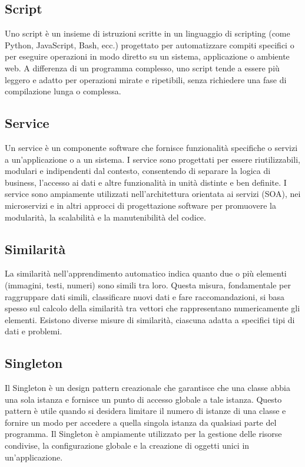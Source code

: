 \subsection*{Script}
Uno script è un insieme di istruzioni scritte in un linguaggio di scripting (come Python, JavaScript, Bash, ecc.) progettato per automatizzare compiti 
specifici o per eseguire operazioni in modo diretto su un sistema, applicazione o ambiente web. A differenza di un programma complesso, uno script tende 
a essere più leggero e adatto per operazioni mirate e ripetibili, senza richiedere una fase di compilazione lunga o complessa.

\hypertarget{sec:service}{}
\subsection*{Service}
Un service è un componente software che fornisce funzionalità specifiche o servizi a un'applicazione o a un sistema. I service sono progettati per
essere riutilizzabili, modulari e indipendenti dal contesto, consentendo di separare la logica di business, l'accesso ai dati e altre funzionalità
in unità distinte e ben definite. I service sono ampiamente utilizzati nell'architettura orientata ai servizi (SOA), nei microservizi e in altri
approcci di progettazione software per promuovere la modularità, la scalabilità e la manutenibilità del codice.

\hypertarget{sec:similarità}{}
\subsection*{Similarità}
La similarità nell'apprendimento automatico indica quanto due o più elementi (immagini, testi, numeri) sono simili tra loro. 
Questa misura, fondamentale per raggruppare dati simili, classificare nuovi dati e fare raccomandazioni, si basa spesso sul calcolo 
della similarità tra vettori che rappresentano numericamente gli elementi. Esistono diverse misure di similarità, ciascuna adatta a 
specifici tipi di dati e problemi.

\hypertarget{sec:singleton}{}
\subsection*{Singleton}
Il Singleton è un design pattern creazionale che garantisce che una classe abbia una sola istanza e fornisce un punto di accesso globale a tale istanza.
Questo pattern è utile quando si desidera limitare il numero di istanze di una classe e fornire un modo per accedere a quella singola istanza da qualsiasi
parte del programma. Il Singleton è ampiamente utilizzato per la gestione delle risorse condivise, la configurazione globale e la creazione di oggetti
unici in un'applicazione.

